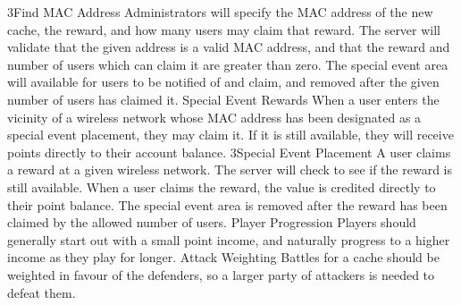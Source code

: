 			{3}{Find MAC Address}
			{Administrators will specify the MAC address of the new cache, the reward, and how many users may claim that reward.}
			{The server will validate that the given address is a valid MAC address, and that the reward and number of users which can claim it are greater than zero.}
			{The special event area will available for users to be notified of and claim, and removed after the given number of users has claimed it.}
		\funcreq
			{Special Event Rewards}
			{When a user enters the vicinity of a wireless network whose MAC address has been designated as a special event placement, they may claim it. If it is still available, they will receive points directly to their account balance.}
			{3}{Special Event Placement}
			{A user claims a reward at a given wireless network.}
			{The server will check to see if the reward is still available.}
			{When a user claims the reward, the value is credited directly to their point balance. The special event area is removed after the reward has been claimed by the allowed number of users.}
		\nonfuncreq
			{Player Progression}
			{Players should generally start out with a small point income, and naturally progress to a higher income as they play for longer.}
		\nonfuncreq
			{Attack Weighting}
			{Battles for a cache should be weighted in favour of the defenders, so a larger party of attackers is needed to defeat them.}

